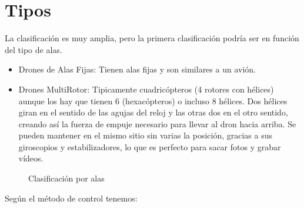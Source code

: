\section{Tipos}
\label{sec:tiposdrones}

La clasificación es muy amplia, pero la primera clasificación podría ser en función del tipo de alas.

\begin{itemize}
\item Drones de Alas Fijas: Tienen alas fijas y son similares a un avión.
\item Drones MultiRotor: Tipicamente cuadricópteros (4 rotores con hélices) aunque los hay que tienen 6 (hexacópteros) o incluso 8 hélices. Dos hélices giran en el sentido de las agujas del reloj y las otras dos en el otro sentido, creando así la fuerza de empuje necesario para llevar al dron hacia arriba. Se pueden mantener en el mismo sitio sin varias la posición, gracias a sus giroscopios y estabilizadores, lo que es perfecto para sacar fotos y grabar vídeos.
\end{itemize}

\begin{figure}[H]
\centering
{}
\caption{Clasificación por alas}
\end{figure}

Según el método de control tenemos:

